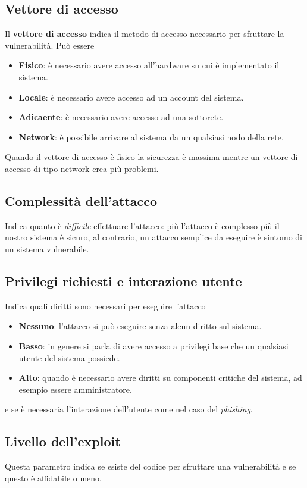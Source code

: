 \subsection{Vettore di accesso}
Il \textbf{vettore di accesso} indica il metodo di accesso necessario per sfruttare la vulnerabilità. Può essere
\begin{itemize}
	\item \textbf{Fisico}: è necessario avere accesso all'hardware su cui è implementato il sistema.
	\item \textbf{Locale}: è necessario avere accesso ad un account del sistema.
	\item \textbf{Adicaente}: è necessario avere accesso ad una sottorete.
	\item \textbf{Network}: è possibile arrivare al sistema da un qualsiasi nodo della rete.
\end{itemize}
Quando il vettore di accesso è fisico la sicurezza è massima mentre un vettore di accesso di tipo network crea più
problemi.

\subsection{Complessità dell'attacco}
Indica quanto è \emph{difficile} effettuare l'attacco: più l'attacco è complesso più il nostro sistema è sicuro, al
contrario, un attacco semplice da eseguire è sintomo di un sistema vulnerabile.

\subsection{Privilegi richiesti e interazione utente}
Indica quali diritti sono necessari per eseguire l'attacco
\begin{itemize}
	\item \textbf{Nessuno}: l'attacco si può eseguire senza alcun diritto sul sistema.
	\item \textbf{Basso}: in genere si parla di avere accesso a privilegi base che un qualsiasi utente del sistema
	      possiede.
	\item \textbf{Alto}: quando è necessario avere diritti su componenti critiche del sistema, ad esempio essere
	      amministratore.
\end{itemize}
e se è necessaria l'interazione dell'utente come nel caso del \emph{phishing}.

\subsection{Livello dell'exploit}
Questa parametro indica se esiste del codice per sfruttare una vulnerabilità e se questo è affidabile o meno.

